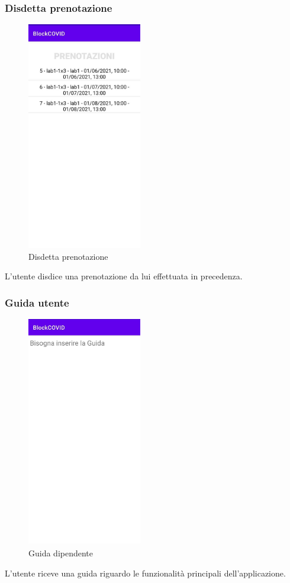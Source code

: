 \subsubsection{Disdetta prenotazione}
\begin{figure}[H]
	\centering
	\includegraphics[width=5cm]{res/images/VisualizzaPrenotazioni.png}
	\caption{Disdetta prenotazione}
\end{figure}
L’utente disdice una prenotazione da lui effettuata in precedenza.
\subsubsection{Guida utente}
\begin{figure}[H]
	\centering
	\includegraphics[width=5cm]{res/images/Guida.png}
	\caption{Guida dipendente}
\end{figure}
L’utente riceve una guida riguardo le funzionalità principali dell'applicazione.
